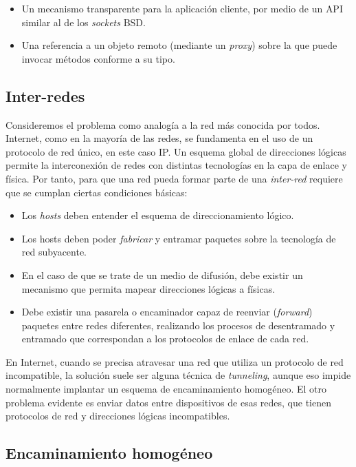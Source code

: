 \documentclass{arco-article}
\newcommand{\fg}[1]{\textit{#1}}
\begin{document}
\begin{itemize}
\item Un mecanismo transparente para la aplicación cliente, por medio
  de un \ac{API} similar al de los \fg{sockets} \ac{BSD}.
\item Una referencia a un objeto remoto (mediante un \fg{proxy}) sobre
  la que puede invocar métodos conforme a su tipo.
\end{itemize}


\subsection{Inter-redes}

Consideremos el problema como analogía a la red más conocida por
todos. Internet, como en la mayoría de las redes, se fundamenta en
el uso de un protocolo de red único, en este caso \ac{IP}. Un esquema
global de direcciones lógicas permite la interconexión de redes con
distintas tecnologías en la capa de enlace y física.  Por tanto, para
que una red pueda formar parte de una \emph{inter-red} requiere que se
cumplan ciertas condiciones básicas:

\begin{itemize}
\item Los \fg{hosts} deben entender el esquema de direccionamiento lógico.

\item Los hosts deben poder \emph{fabricar} y entramar paquetes sobre
  la tecnología de red subyacente.

\item En el caso de que se trate de un medio de difusión, debe existir
  un mecanismo que permita mapear direcciones lógicas a físicas.

\item Debe existir una pasarela o encaminador capaz de reenviar
  (\emph{forward}) paquetes entre redes diferentes, realizando los
  procesos de desentramado y entramado que correspondan a los
  protocolos de enlace de cada red.
\end{itemize}

En Internet, cuando se precisa atravesar una red que utiliza un
protocolo de red incompatible, la solución suele ser alguna técnica de
\emph{tunneling}, aunque eso impide normalmente implantar un esquema
de encaminamiento homogéneo.  El otro problema evidente es enviar
datos entre dispositivos de esas redes, que tienen protocolos de red y
direcciones lógicas incompatibles.


\subsection{Encaminamiento homogéneo}
\end{document}
